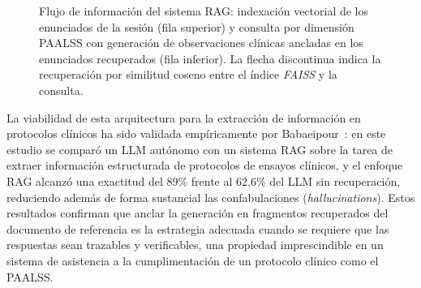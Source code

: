 \begin{figure}[htbp]
  \centering
  \caption[Flujo del sistema \acs{RAG}]{Flujo de información del sistema \ac{RAG}:
  indexación vectorial de los enunciados de la sesión (fila superior) y consulta por
  dimensión \ac{PAALSS} con generación de observaciones clínicas ancladas en los
  enunciados recuperados (fila inferior). La flecha discontinua indica la recuperación
  por similitud coseno entre el índice \emph{FAISS} y la consulta.}
  \label{fig:rag_flujo}
\end{figure}

La viabilidad de esta arquitectura para la extracción de información en protocolos
clínicos ha sido validada empíricamente por Babaeipour~\cite{clinical_nlp_ai_protocol}: en este
estudio se comparó un \ac{LLM} autónomo con un sistema \ac{RAG} sobre la tarea de
extraer información estructurada de protocolos de ensayos clínicos, y el enfoque \ac{RAG}
alcanzó una exactitud del 89\% frente al 62{,}6\% del \ac{LLM} sin recuperación,
reduciendo además de forma sustancial las confabulaciones (\emph{hallucinations}).
Estos resultados confirman que anclar la generación en fragmentos recuperados del
documento de referencia es la estrategia adecuada cuando se requiere que las respuestas
sean trazables y verificables, una propiedad imprescindible en un sistema de asistencia
a la cumplimentación de un protocolo clínico como el \ac{PAALSS}.

